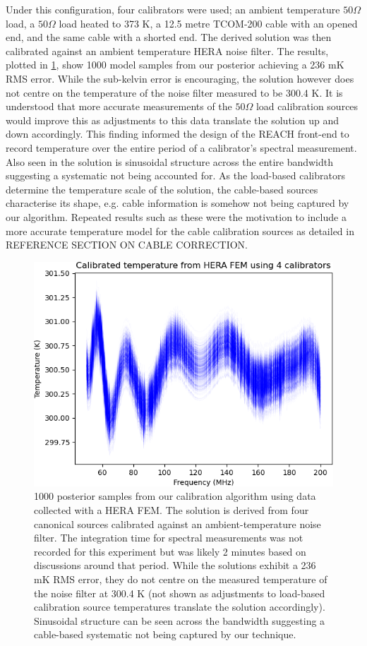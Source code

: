 Under this configuration, four calibrators were used; an ambient temperature $50 \Omega$ load, a $50 \Omega$ load heated to 373 K, a 12.5 metre TCOM-200 cable with an opened end, and the same cable with a shorted end. The derived solution was then calibrated against an ambient temperature HERA noise filter. The results, plotted in \cref{fig:hera_results}, show 1000 model samples from our posterior achieving a 236 mK RMS error. While the sub-kelvin error is encouraging, the solution however does not centre on the temperature of the noise filter measured to be 300.4 K. It is understood that more accurate measurements of the $50 \Omega$ load calibration sources would improve this as adjustments to this data translate the solution up and down accordingly. This finding informed the design of the REACH front-end to record temperature over the entire period of a calibrator’s spectral measurement. Also seen in the solution is sinusoidal structure across the entire bandwidth suggesting a systematic not being accounted for. As the load-based calibrators determine the temperature scale of the solution, the cable-based sources characterise its shape, e.g. cable information is somehow not being captured by our algorithm. Repeated results such as these were the motivation to include a more accurate temperature model for the cable calibration sources as detailed in REFERENCE SECTION ON CABLE CORRECTION.
\begin{figure}
    \centering
    \includegraphics[width=.8\textwidth]{hera_results}
    \caption{1000 posterior samples from our calibration algorithm using data collected with a HERA FEM. The solution is derived from four canonical sources calibrated against an ambient-temperature noise filter. The integration time for spectral measurements was not recorded for this experiment but was likely 2 minutes based on discussions around that period. While the solutions exhibit a 236 mK RMS error, they do not centre on the measured temperature of the noise filter at 300.4 K (not shown as adjustments to load-based calibration source temperatures translate the solution accordingly). Sinusoidal structure can be seen across the bandwidth suggesting a cable-based systematic not being captured by our technique.}
    \label{fig:hera_results}
\end{figure}